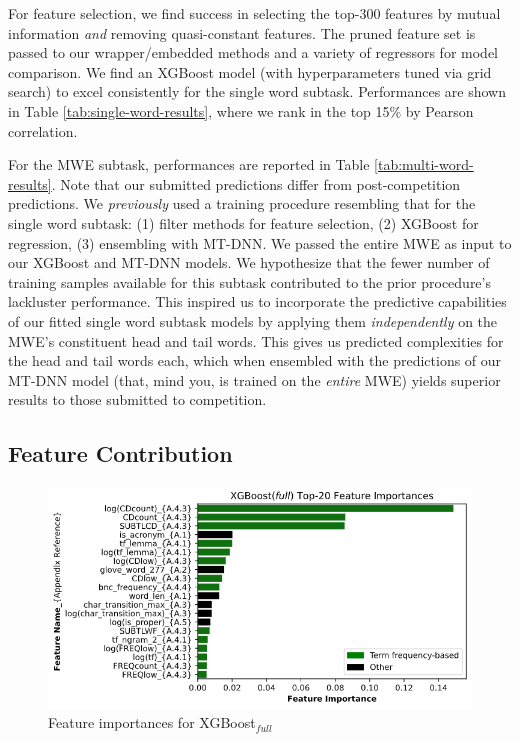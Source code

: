 \documentclass[11pt,a4paper]{article}
\begin{document}
\label{sec:performance}

For feature selection, we find success in selecting the top-300 features by mutual information \textit{and} removing quasi-constant features. The pruned feature set is passed to our wrapper/embedded methods and a variety of regressors for model comparison. We find an XGBoost model (with hyperparameters tuned via grid search) to excel consistently for the single word subtask. Performances are shown in Table \ref{tab:single-word-results}, where we rank in the top 15\% by Pearson correlation. 

For the MWE subtask, performances are reported in Table \ref{tab:multi-word-results}. Note that our submitted predictions differ from post-competition predictions. We \textit{previously} used a training procedure resembling that for the single word subtask: (1) filter methods for feature selection, (2) XGBoost for regression, (3) ensembling with MT-DNN. We passed the entire MWE as input to our XGBoost and MT-DNN models. We hypothesize that the fewer number of training samples available for this subtask contributed to the prior procedure's lackluster performance. This inspired us to incorporate the predictive capabilities of our fitted single word subtask models by applying them \textit{independently} on the MWE's constituent head and tail words. This gives us predicted complexities for the head and tail words each, which when ensembled with the predictions of our MT-DNN model (that, mind you, is trained on the \textit{entire} MWE) yields superior results to those submitted to competition.

\subsection{Feature Contribution}

\begin{figure}
  \centering
  \includegraphics[scale=0.3]{xgboost_feature_importances.png}
  \captionsetup{justification=centering}
  \caption{\label{fig:xgboost_feature_importance} Feature importances for XGBoost$_\textit{full}$}
\end{figure}
\end{document}
